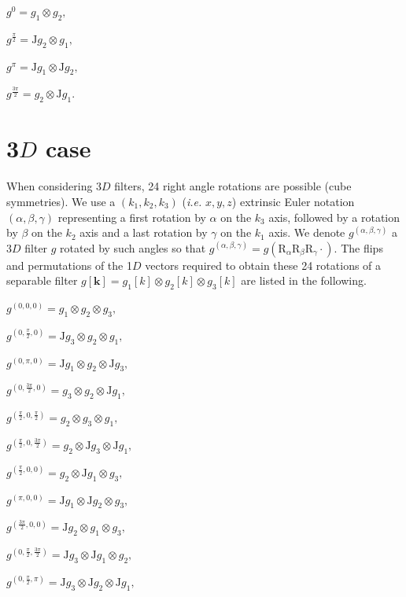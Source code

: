 \documentclass[fleqn,a4paper,oneside,openany]{book}
\begin{document}
$g^0= g_{1}\otimes g_{2},$

$g^{\frac{\pi}{2}}= \mathrm{J} g_{2}\otimes g_{1},$

$g^{\pi}= \mathrm{J} g_{1}\otimes \mathrm{J} g_{2},$

$g^{\frac{3\pi}{2}}= g_{2}\otimes \mathrm{J} g_{1}.$


\section{3$D$ case}
When considering 3$D$ filters, 24 right angle rotations are possible (cube symmetries). 
We use a $(k_1,k_2,k_3)$ (\textit{i.e.} $x,y,z$) extrinsic Euler notation $(\alpha,\beta,\gamma)$ representing a first rotation by $\alpha$ on the $k_3$ axis, followed by a rotation by $\beta$ on the $k_2$ axis and a last rotation by $\gamma$ on the $k_1$ axis.
We denote $g^{(\alpha,\beta,\gamma)}$ a 3$D$ filter $g$ rotated by such angles so that $g^{(\alpha,\beta,\gamma)} = g(\mathrm{R}_{\alpha}\mathrm{R}_{\beta}\mathrm{R}_{\gamma}\cdot)$.
The flips and permutations of the 1$D$ vectors required to obtain these 24 rotations of a separable filter $g[\boldsymbol{k}]= g_{1}[k]\otimes g_{2}[k]\otimes g_{3}[k]$ are listed in the following.

$g^{(0,0,0)}= g_{1}\otimes g_{2}\otimes g_{3},$

$g^{(0,\frac{\pi}{2},0)}= \mathrm{J}g_{3}\otimes g_{2}\otimes g_{1},$

$g^{(0,\pi,0)}= \mathrm{J}g_{1}\otimes g_{2}\otimes \mathrm{J}g_{3},$

$g^{(0,\frac{3\pi}{2},0)}= g_{3}\otimes g_{2}\otimes \mathrm{J}g_{1},$

$g^{(\frac{\pi}{2},0,\frac{\pi}{2})}= g_{2}\otimes g_{3}\otimes g_{1},$

$g^{(\frac{\pi}{2},0,\frac{3\pi}{2})}= g_{2}\otimes \mathrm{J}g_{3}\otimes \mathrm{J}g_{1},$

$g^{(\frac{\pi}{2},0,0)}= g_{2}\otimes \mathrm{J}g_{1}\otimes g_{3},$

$g^{(\pi,0,0)}= \mathrm{J}g_{1} \otimes \mathrm{J}g_{2}\otimes g_{3},$

$g^{(\frac{3\pi}{2},0,0)}= \mathrm{J}g_{2}\otimes g_{1}\otimes g_{3},$

$g^{(0,\frac{\pi}{2},\frac{3\pi}{2})}= \mathrm{J}g_{3}\otimes \mathrm{J}g_{1}\otimes g_{2},$

$g^{(0,\frac{\pi}{2},\pi)}= \mathrm{J}g_{3}\otimes \mathrm{J}g_{2}\otimes \mathrm{J}g_{1},$
\end{document}
